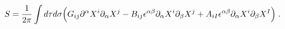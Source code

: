 \begin{equation}
 S_{\rm }= {1\over 2\pi} \int d\tau d\sigma \Bigl( 
 G_{ij} \partial^\alpha X^i \partial_\alpha X^j -
 B_{ij}  \epsilon^{\alpha\beta} \partial_\alpha X^{ i} 
         \partial_\beta X^{j} +
 A_{ iI} \epsilon^{\alpha\beta} \partial_\alpha X^{ i} 
         \partial_\beta X^{ I}       
\Bigr)\;.
\label{S}
\end{equation}

